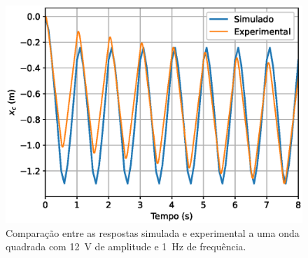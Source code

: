 \begin{figure}[H]
    \centering
    \includegraphics[width=0.8\linewidth]{figuras/validacao_12V.eps}
    \caption[Comparação entre as respostas simulada e experimental a uma onda quadrada com 12~V de amplitude e 1~Hz de frequência]{Comparação entre as respostas simulada e experimental a uma onda quadrada com 12~V de amplitude e 1~Hz de frequência.}
    \label{fig:validacao_12V}
\end{figure}
